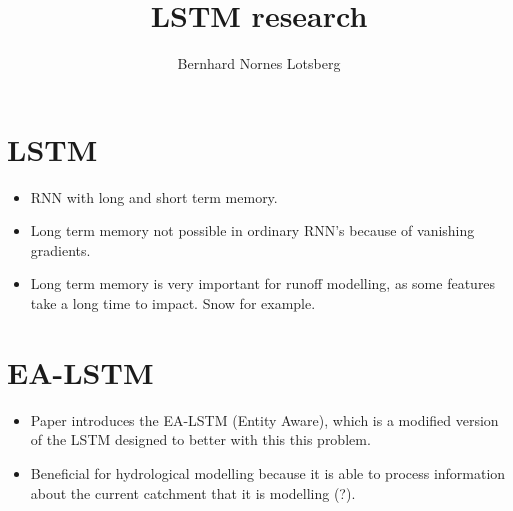 \documentclass[a4paper,12pt,english]{article}
\title{LSTM research}
\author{Bernhard Nornes Lotsberg}
\begin{document}
\maketitle
\section*{LSTM}
\begin{itemize}
\item RNN with long and short term memory.
\item Long term memory not possible in ordinary RNN's because of vanishing gradients.
\item Long term memory is very important for runoff modelling, as some features take a long time to impact. Snow for example.
\end{itemize}

\section*{EA-LSTM}
\begin{itemize}
\item Paper \cite{lstm_second_paper} introduces the EA-LSTM (Entity Aware), which is a modified version of the LSTM designed to better with this this problem.
\item Beneficial for hydrological modelling because it is able to process information about the current catchment that it is modelling (?). 
\end{itemize}
\end{document}
